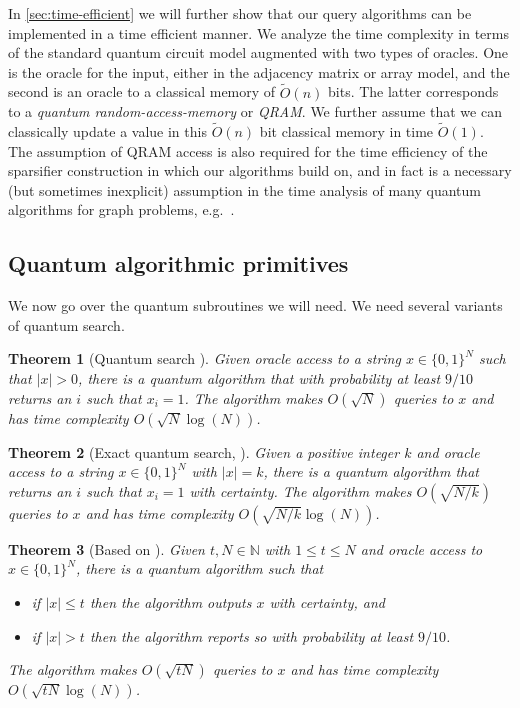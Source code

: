 \documentclass[10pt,a4paper]{article}
\newcommand{\N}{\mathbb{N}}
\newcommand{\tO}{\tilde O}
\newcommand{\1}{\mathbf{1}}
\newtheorem{theorem}{Theorem}
\theoremstyle{definition}
\begin{document}
In \cref{sec:time-efficient} we will further show that our query algorithms can be implemented in a time efficient manner.  We analyze the time complexity in terms of the standard quantum circuit model augmented with two types of oracles.  
One is the oracle for the input, either in the adjacency matrix or array model, and the second is an oracle to a classical memory of $\tO(n)$ bits.  The latter corresponds to a \emph{quantum random-access-memory} or \emph{QRAM}.  We further assume that 
we can classically update a value in this $\tO(n)$ bit classical memory in time $\tO(1)$.  
The assumption of QRAM access is also required for the time efficiency of the sparsifier construction in \cite{AdW19} which our algorithms build on, and in fact is a necessary (but sometimes inexplicit) assumption in the time analysis of many quantum algorithms for graph problems, e.g.~\cite{DHHM06,Amb06,B13}.

\subsection{Quantum algorithmic primitives}
We now go over the quantum subroutines we will need.  We need several variants of quantum search.
\begin{theorem}[Quantum search \cite{Gro97}]
\label{thm:grover}
Given oracle access to a string $x \in \{0,1\}^N$ such that $|x| > 0$,
there is a quantum algorithm that with probability at least $9/10$ returns an $i$ such that $x_i = 1$.
The algorithm makes $O(\sqrt{N})$ queries to $x$ and has time complexity $O(\sqrt{N} \log(N))$.
\end{theorem}

\begin{theorem}[{Exact quantum search, \cite[Theorem 4]{BHMT02}}]
\label{thm:qexact}
Given a positive integer $k$ and oracle access to a string $x \in \{0,1\}^N$ with $|x| = k$,
there is a quantum algorithm that returns an $i$ such that $x_i=1$ with certainty.
The algorithm makes $O(\sqrt{N/k})$ queries to $x$ and has time complexity $O(\sqrt{N/k} \log(N))$.
\end{theorem}

\begin{theorem}[{Based on \cite[Theorem 3]{BCWZ99}}]
\label{thm:qsearch}
Given $t,N \in \N$ with $1 \le t \le N$ and oracle access to $x \in \{0,1\}^N$,  there is a quantum algorithm such that
\begin{itemize}
  \item if $|x| \le t$ then the algorithm outputs $x$ with certainty, and
  \item if $|x| > t$ then the algorithm reports so with probability at least $9/10$.
\end{itemize}
The algorithm makes $O(\sqrt{tN})$ queries to $x$ and has time complexity $O(\sqrt{tN} \log(N))$.
\end{theorem}
\end{document}
